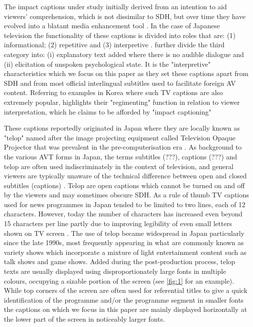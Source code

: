 \documentclass[output=paper]{langsci/langscibook}
\begin{document}
The impact captions under study initially derived from an intention to aid viewers' comprehension, which is not dissimilar to SDH, but over time they have evolved into a blatant media enhancement tool \citep[pp. 48--50]{Kato2012}.  In the case of Japanese television the functionality of these captions is divided into roles that are: (1) informational; (2) repetitive and (3) interpretive \citep[pg. 72]{Shiota2003}. \citet{Kimura2000} further divide the third category into: (i) explanatory text added where there is no audible dialogue and (ii) elicitation of unspoken psychological state. It is the "interpretive" characteristics which we focus on this paper as they set these captions apart from SDH and from most official interlingual subtitles used to facilitate foreign AV content. Referring to examples in Korea where such TV captions are also extremely popular, \citet{Park2009} highlights their "regimenting" function in relation to viewer interpretation, which he claims to be afforded by "impact captioning"   

These captions reportedly originated in Japan where they are locally known as "telop" named after the image projecting equipment called Television Opaque Projector that was prevalent in the pre-computerisation era \citep{Sakamoto1999}. As background to the various AVT forms in Japan, the terms subtitles (???), captions (???) and telop are often used indiscriminately in the context of television, and general viewers are typically unaware of the technical difference between open and closed subtitles (captions) \citep[pp. 73--74]{ohagan2010}. Telop are open captions which cannot be turned on and off by the viewers and may sometimes obscure SDH.  As a rule of thumb TV captions used for news programmes in Japan tended to be limited to two lines, each of 12 characters. However, today the number of characters has increased even beyond 15 characters per line partly due to improving legibility of even small letters shown on TV screen \citep[pp. 47--48]{Kato2012}. The use of telop became widespread in Japan particularly since the late 1990s, most frequently appearing in what are commonly known as variety shows \citep{Shitara2012} which incorporate a mixture of light entertainment content such as talk shows and game shows. Added during the post-production process, telop texts are usually displayed using disproportionately large fonts in multiple colours, occupying a sizable portion of the screen (see \ref{fig:1} for an example).  While top corners of the screen are often used for referential titles to give a quick identification of the programme and/or the programme segment in smaller fonts the captions on which we focus in this paper are mainly displayed horizontally at the lower part of the screen in noticeably larger fonts. 
\end{document}
